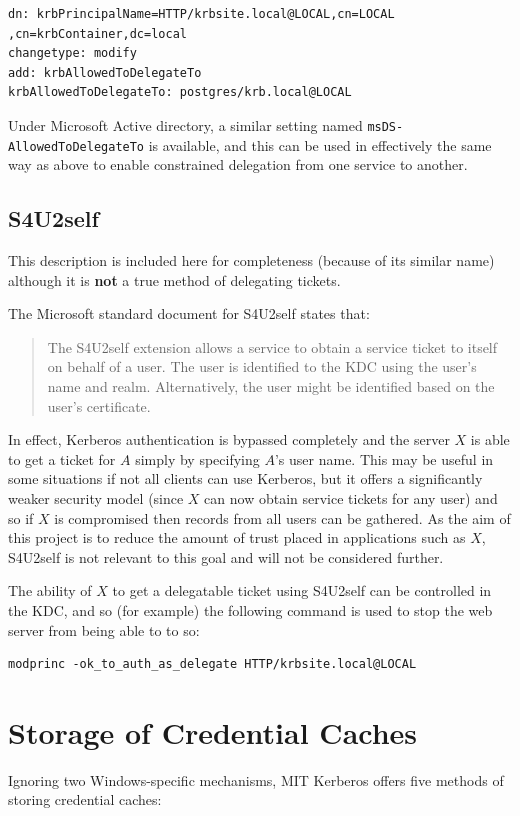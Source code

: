 \documentclass[12pt]{report}
\begin{document}
\begin{verbatim}
dn: krbPrincipalName=HTTP/krbsite.local@LOCAL,cn=LOCAL
,cn=krbContainer,dc=local
changetype: modify
add: krbAllowedToDelegateTo
krbAllowedToDelegateTo: postgres/krb.local@LOCAL
\end{verbatim}

Under Microsoft Active directory, a similar setting named \texttt{msDS-AllowedToDelegateTo} is available, and this can be used in effectively the same way as above to enable constrained delegation from one service to another\cite{MS-deleg-attribute}.

\subsection{S4U2self}
This description is included here for completeness (because of its similar name) although it is \textbf{not} a true method of delegating tickets.

The Microsoft standard document for S4U2self\cite{MS-s4u2} states that:

\begin{quote}
  The S4U2self extension allows a service to obtain a service ticket to itself on behalf of a user. The user is identified to the KDC using the user's name and realm. Alternatively, the user might be identified based on the user's certificate.
\end{quote}

In effect, Kerberos authentication is bypassed completely and the server $X$ is able to get a ticket for $A$ simply by specifying $A$'s user name. This may be useful in some situations if not all clients can use Kerberos, but it offers a significantly weaker security model (since $X$ can now obtain service tickets for any user) and so if $X$ is compromised then records from all users can be gathered. As the aim of this project is to reduce the amount of trust placed in applications such as $X$, S4U2self is not relevant to this goal and will not be considered further.

The ability of $X$ to get a delegatable ticket using S4U2self can be controlled in the KDC, and so (for example) the following command is used to stop the web server from being able to to so:

\begin{verbatim}
modprinc -ok_to_auth_as_delegate HTTP/krbsite.local@LOCAL
\end{verbatim}

\section{Storage of Credential Caches}
\label{sec:storage_of_credential_caches}
Ignoring two Windows-specific mechanisms, MIT Kerberos offers five methods of storing credential caches\cite{MIT-ccache-types}:
\end{document}
